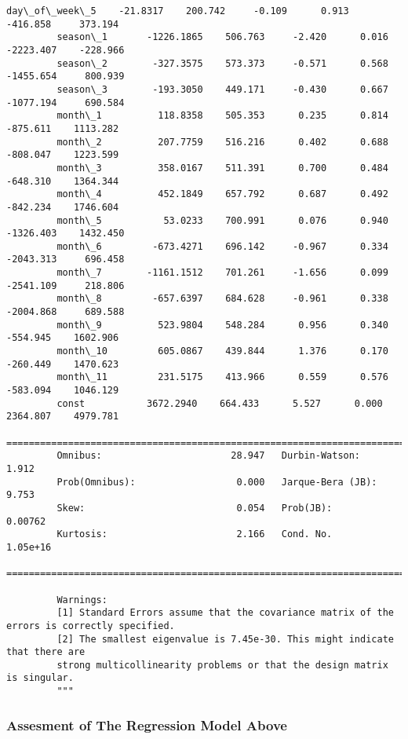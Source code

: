 \documentclass[11pt]{article}
\begin{document}
\begin{Verbatim}[commandchars=\\\{\}]
         day\_of\_week\_5    -21.8317    200.742     -0.109      0.913    -416.858     373.194
         season\_1       -1226.1865    506.763     -2.420      0.016   -2223.407    -228.966
         season\_2        -327.3575    573.373     -0.571      0.568   -1455.654     800.939
         season\_3        -193.3050    449.171     -0.430      0.667   -1077.194     690.584
         month\_1          118.8358    505.353      0.235      0.814    -875.611    1113.282
         month\_2          207.7759    516.216      0.402      0.688    -808.047    1223.599
         month\_3          358.0167    511.391      0.700      0.484    -648.310    1364.344
         month\_4          452.1849    657.792      0.687      0.492    -842.234    1746.604
         month\_5           53.0233    700.991      0.076      0.940   -1326.403    1432.450
         month\_6         -673.4271    696.142     -0.967      0.334   -2043.313     696.458
         month\_7        -1161.1512    701.261     -1.656      0.099   -2541.109     218.806
         month\_8         -657.6397    684.628     -0.961      0.338   -2004.868     689.588
         month\_9          523.9804    548.284      0.956      0.340    -554.945    1602.906
         month\_10         605.0867    439.844      1.376      0.170    -260.449    1470.623
         month\_11         231.5175    413.966      0.559      0.576    -583.094    1046.129
         const           3672.2940    664.433      5.527      0.000    2364.807    4979.781
         ==============================================================================
         Omnibus:                       28.947   Durbin-Watson:                   1.912
         Prob(Omnibus):                  0.000   Jarque-Bera (JB):                9.753
         Skew:                           0.054   Prob(JB):                      0.00762
         Kurtosis:                       2.166   Cond. No.                     1.05e+16
         ==============================================================================
         
         Warnings:
         [1] Standard Errors assume that the covariance matrix of the errors is correctly specified.
         [2] The smallest eigenvalue is 7.45e-30. This might indicate that there are
         strong multicollinearity problems or that the design matrix is singular.
         """
\end{Verbatim}
            
    \subsubsection{Assesment of The Regression Model
Above}\label{assesment-of-the-regression-model-above}
\end{document}
